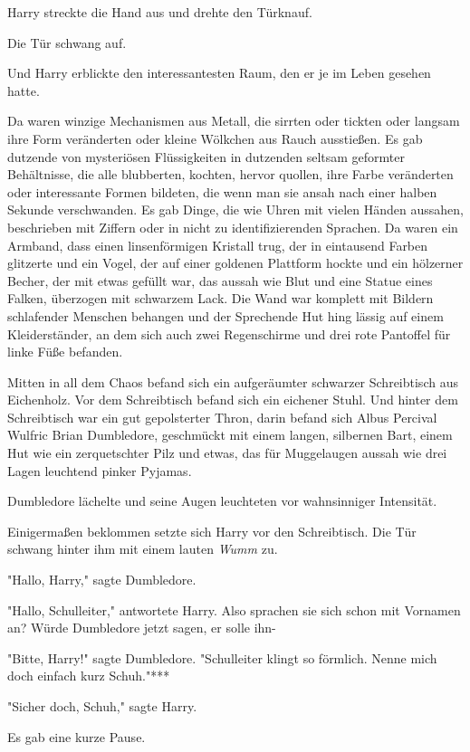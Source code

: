 {Harry streckte die Hand aus und drehte den Türknauf.

Die Tür schwang auf.

Und Harry erblickte den interessantesten Raum, den er je im Leben gesehen hatte.

Da waren winzige Mechanismen aus Metall, die sirrten oder tickten oder langsam ihre Form veränderten oder kleine Wölkchen aus Rauch ausstießen. Es gab dutzende von mysteriösen Flüssigkeiten in dutzenden seltsam geformter Behältnisse, die alle blubberten, kochten, hervor quollen, ihre Farbe veränderten oder interessante Formen bildeten, die wenn man sie ansah nach einer halben Sekunde verschwanden. Es gab Dinge, die wie Uhren mit vielen Händen aussahen, beschrieben mit Ziffern oder in nicht zu identifizierenden Sprachen. Da waren ein Armband, dass einen linsenförmigen Kristall trug, der in eintausend Farben glitzerte und ein Vogel, der auf einer goldenen Plattform hockte und ein hölzerner Becher, der mit etwas gefüllt war, das aussah wie Blut und eine Statue eines Falken, überzogen mit schwarzem Lack. Die Wand war komplett mit Bildern schlafender Menschen behangen und der Sprechende Hut hing lässig auf einem Kleiderständer, an dem sich auch zwei Regenschirme und drei rote Pantoffel für linke Füße befanden.

Mitten in all dem Chaos befand sich ein aufgeräumter schwarzer Schreibtisch aus Eichenholz. Vor dem Schreibtisch befand sich ein eichener Stuhl. Und hinter dem Schreibtisch war ein gut gepolsterter Thron, darin befand sich Albus Percival Wulfric Brian Dumbledore, geschmückt mit einem langen, silbernen Bart, einem Hut wie ein zerquetschter Pilz und etwas, das für Muggelaugen aussah wie drei Lagen leuchtend pinker Pyjamas.

Dumbledore lächelte und seine Augen leuchteten vor wahnsinniger Intensität.

Einigermaßen beklommen setzte sich Harry vor den Schreibtisch. Die Tür schwang hinter ihm mit einem lauten \emph{Wumm} zu.

"Hallo, Harry," sagte Dumbledore.

"Hallo, Schulleiter," antwortete Harry. Also sprachen sie sich schon mit Vornamen an? Würde Dumbledore jetzt sagen, er solle ihn-

"Bitte, Harry!" sagte Dumbledore. "Schulleiter klingt so förmlich. Nenne mich doch einfach kurz Schuh."***

"Sicher doch, Schuh," sagte Harry.

Es gab eine kurze Pause.

}
